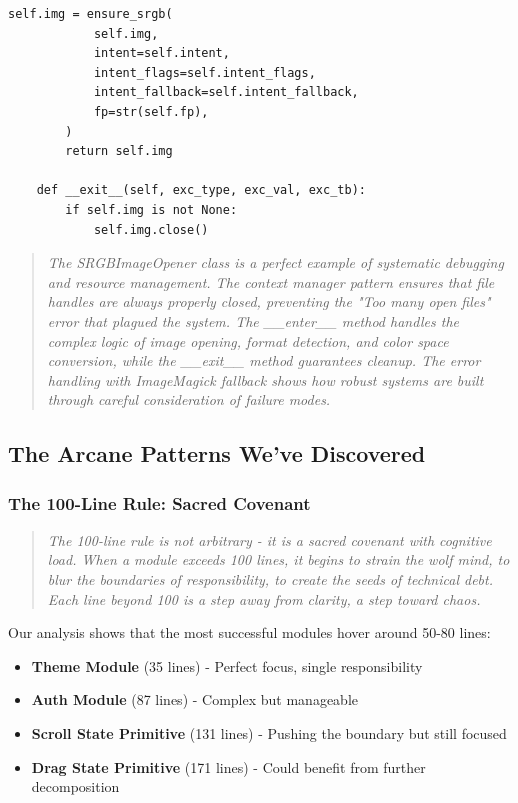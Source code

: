 \documentclass[11pt]{article}
\begin{document}
\begin{lstlisting}[style=python]
        self.img = ensure_srgb(
            self.img,
            intent=self.intent,
            intent_flags=self.intent_flags,
            intent_fallback=self.intent_fallback,
            fp=str(self.fp),
        )
        return self.img
    
    def __exit__(self, exc_type, exc_val, exc_tb):
        if self.img is not None:
            self.img.close()
\end{lstlisting}

\begin{quote}
\emph{The SRGBImageOpener class is a perfect example of systematic debugging and resource management. The context manager pattern ensures that file handles are always properly closed, preventing the "Too many open files" error that plagued the system. The \_\_enter\_\_ method handles the complex logic of image opening, format detection, and color space conversion, while the \_\_exit\_\_ method guarantees cleanup. The error handling with ImageMagick fallback shows how robust systems are built through careful consideration of failure modes.}
\end{quote}

\subsection{The Arcane Patterns We've Discovered}

\subsubsection{The 100-Line Rule: Sacred Covenant}

\begin{quote}
\emph{The 100-line rule is not arbitrary - it is a sacred covenant with cognitive load. When a module exceeds 100 lines, it begins to strain the wolf mind, to blur the boundaries of responsibility, to create the seeds of technical debt. Each line beyond 100 is a step away from clarity, a step toward chaos.}
\end{quote}

Our analysis shows that the most successful modules hover around 50-80 lines:

\begin{itemize}
\item \textbf{Theme Module} (35 lines) - Perfect focus, single responsibility
\item \textbf{Auth Module} (87 lines) - Complex but manageable
\item \textbf{Scroll State Primitive} (131 lines) - Pushing the boundary but still focused
\item \textbf{Drag State Primitive} (171 lines) - Could benefit from further decomposition
\end{itemize}
\end{document}
